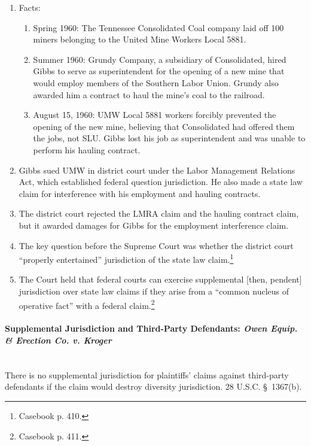 \begin{enumerate}
    \item Facts:
    \begin{enumerate}
        \item Spring 1960: The Tennessee Consolidated Coal company laid off 
        100 miners belonging to the United Mine Workers Local 5881.
        \item Summer 1960: Grundy Company, a subsidiary of Consolidated, hired 
        Gibbs to serve as superintendent for the opening of a new mine that 
        would employ members of the Southern Labor Union. Grundy also awarded 
        him a contract to haul the mine's coal to the railroad.
        \item August 15, 1960: UMW Local 5881 workers forcibly prevented the 
        opening of the new mine, believing that Consolidated had offered them 
        the jobs, not SLU. Gibbs lost his job as superintendent and was unable 
        to perform his hauling contract.
    \end{enumerate}
    \item Gibbs sued UMW in district court under the Labor Management 
    Relations Act, which established federal question jurisdiction. He also 
    made a state law claim for interference with his employment and hauling 
    contracts.
    \item The district court rejected the LMRA claim and the hauling contract 
    claim, but it awarded damages for Gibbs for the employment interference 
    claim.
    \item The key question before the Supreme Court was whether the district 
    court ``properly entertained'' jurisdiction of the state law 
    claim.\footnote{Casebook p. 410.}
    \item The Court held that federal courts can exercise supplemental [then, 
    pendent] jurisdiction over state law claims if they arise from a ``common 
    nucleus of operative fact'' with a federal claim.\footnote{Casebook p.  
    411.}
\end{enumerate}

\paragraph{Supplemental Jurisdiction and Third-Party Defendants: \emph{Owen 
Equip. \& Erection Co. v. Kroger}\\\\}

There is no supplemental jurisdiction for plaintiffs' claims against 
third-party defendants if the claim would destroy diversity jurisdiction. 28 
U.S.C. \S\ 1367(b).

